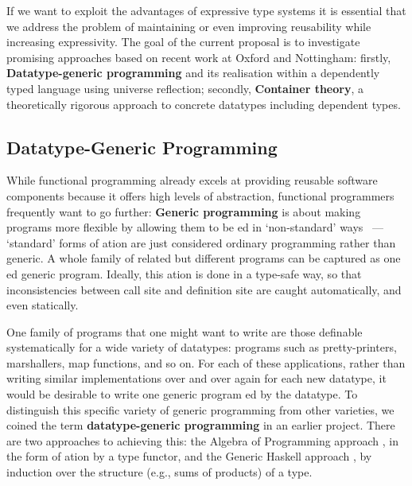 \documentclass[a4paper]{article}
\begin{document}
If we want to exploit the advantages of expressive
type systems it is essential that we
address %
the problem of
maintaining or even improving reusability while increasing
expressivity. %
The goal of the current proposal is to investigate
promising approaches based on recent work at Oxford and 
Nottingham:
firstly, \textbf{Datatype-generic programming} and its realisation
within a dependently typed language using universe reflection; 
secondly, \textbf{Container theory}, a theoretically
rigorous approach to concrete datatypes including dependent types.

\subsection*{Datatype-Generic Programming}
\label{sec:datatype-gener-progr}

While functional programming already excels at providing reusable
software components because it offers high levels of abstraction, 
functional programmers frequently want to go further: 
\textbf{Generic programming} is about making programs more flexible by
allowing them to be \parametris{}ed in `non-standard' ways \cite{backhouse:cpw}~--- `standard'
forms of \parametris{}ation are just considered ordinary programming
rather than generic. 
A whole family of related but different programs can be captured as one \parametris{}ed generic program. %
Ideally, this \parametris{}ation is done in a
type-safe way, so that inconsistencies between call site and
definition site are caught automatically, and even statically.

One family of programs that one might want to write are those
definable systematically for a wide variety of datatypes: programs such as
pretty-printers, marshallers, map functions, and so on. For each of
these applications, rather than writing similar implementations over
and over again for each new datatype, it would be desirable to write
one generic program \parametris{}ed by the datatype.  To distinguish
this specific variety of generic programming from other varieties, we
coined the term \textbf{datatype-generic programming}
\cite{Gibbons2003:Patterns} in an earlier project.  There are two
approaches to achieving this: the Algebra of Programming approach
\cite{bird97algebra}, in the form of \parametris{}ation by a type
functor, and the %
Generic Haskell approach \cite{Hinze&Jeuring2003:Generic},
by %
induction over the structure (e.g., %
sums of products) of a type.
\end{document}
